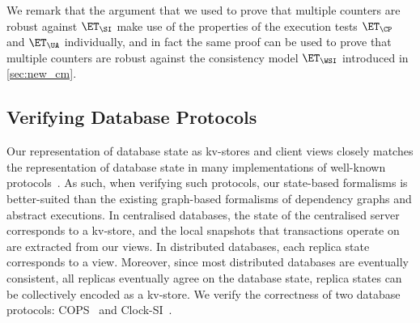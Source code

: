We remark that the argument that we used to prove that multiple counters are robust against $\ET_{\SI}$ make use 
of the properties of the execution tests $\ET_{\CP}$ and $\ET_{\UA}$ individually, and in fact the same proof can 
be used to prove that multiple counters are robust against the consistency model $\ET_{\WSI}$ 
introduced in \cref{sec:new_cm}. 


\subsection{Verifying Database Protocols}
\label{sec:verify-impl}
Our representation of database state as kv-stores and client views closely matches the representation of database state in many implementations of 
well-known protocols~\cite{ramp,rola,cops,wren,redblue,PSI,NMSI,gdur,clocksi,distrsi}.
As such, when verifying such protocols, our state-based formalisms is better-suited than the existing graph-based formalisms of dependency graphs and abstract executions. 
In centralised databases, the state of the centralised server corresponds to a kv-store,
and the local snapshots that transactions operate on are extracted from our views.  
In distributed databases, each replica state corresponds to a view. 
Moreover, since most distributed databases are eventually consistent, 
\ie all replicas eventually agree on the database state,
replica states can be collectively encoded as a kv-store.
We verify the correctness of two database protocols:
COPS~\cite{cops} and Clock-SI~\cite{clocksi}.

